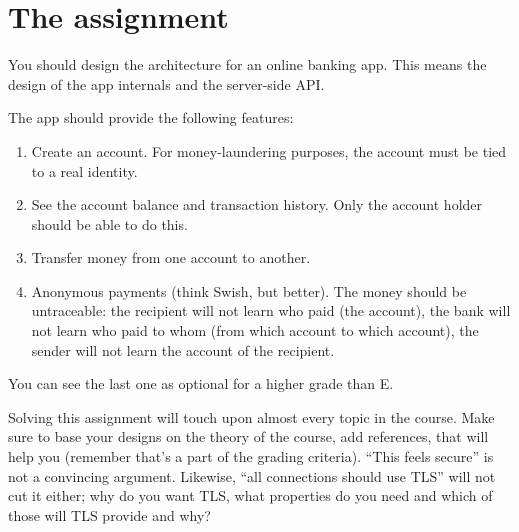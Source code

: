 \section*{The assignment}

You should design the architecture for an online banking app.
This means the design of the app internals and the server-side API\@.

The app should provide the following features:
\begin{enumerate}
  \item Create an account.
    For money-laundering purposes, the account must be tied to a real identity.

  \item See the account balance and transaction history.
    Only the account holder should be able to do this.

  \item Transfer money from one account to another.

  \item Anonymous payments (think Swish, but better).
    The money should be untraceable:
    the recipient will not learn who paid (\eg the account),
    the bank will not learn who paid to whom (\eg from which account to which 
    account),
    the sender will not learn the account of the recipient.
\end{enumerate}

You can see the last one as optional for a higher grade than E.

Solving this assignment will touch upon almost every topic in the course.
Make sure to base your designs on the theory of the course, add references, 
that will help you (remember that's a part of the grading criteria).
\enquote{This feels secure} is not a convincing argument.
Likewise, \enquote{all connections should use TLS} will not cut it either; why 
do you want TLS, what properties do you need and which of those will TLS 
provide and why?
